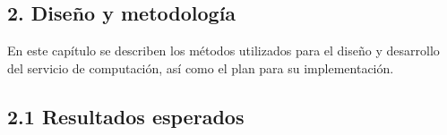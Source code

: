 \begin{doublespace}
  \begin{tightcenter}
    \section{2. Diseño y metodología}
    \mylinespacing
  \end{tightcenter}

    En este capítulo se describen los métodos utilizados para el diseño y
    desarrollo del servicio de computación, así como el plan para su
    implementación.

    \subsection{2.1 Resultados esperados}


\end{doublespace}
